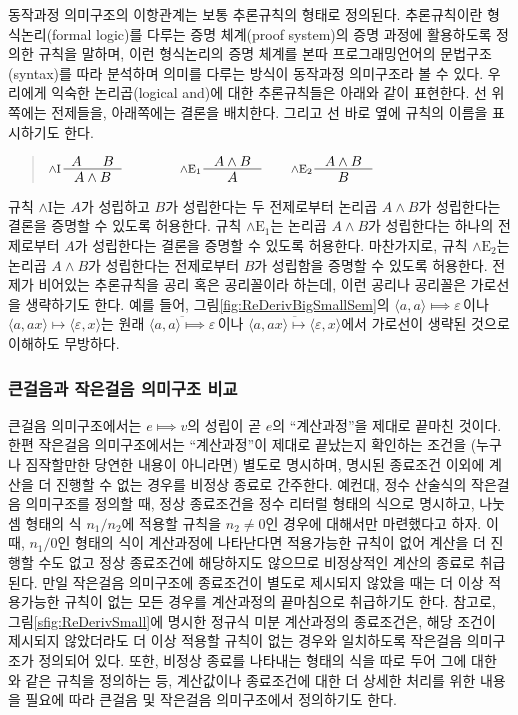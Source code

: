동작과정 의미구조의 이항관계는 보통 추론규칙의 형태로 정의된다.
추론규칙이란 형식논리(formal logic)를 다루는 증명 체계(proof system)의
증명 과정에 활용하도록 정의한 규칙을 말하며, 이런 형식논리의 증명 체계를
본따 프로그래밍언어의 문법구조(syntax)를 따라 분석하며 의미를 다루는 방식이
동작과정 의미구조라 볼 수 있다. 우리에게 익숙한 논리곱(logical and)에 대한
추론규칙들은 아래와 같이 표현한다. 선 위쪽에는 전제들을, 아래쪽에는
결론을 배치한다. 그리고 선 바로 옆에 규칙의 이름을 표시하기도 한다.
\begin{quote}
\( \inference*[$\land\mathrm{I}$]{A & B}{A \land B}\qquad\qquad
   \inference[$\land\mathrm{E}_1$]{A\land B}{A} \qquad
   \inference[$\land\mathrm{E}_2$]{A\land B}{B} \)
\end{quote}
규칙 $\land\mathrm{I}$는 $A$가 성립하고 $B$가 성립한다는 두 전제로부터
논리곱 $A\land B$가 성립한다는 결론을 증명할 수 있도록 허용한다.
규칙 $\land\mathrm{E}_1$는 논리곱 $A\land B$가 성립한다는 하나의 전제로부터
$A$가 성립한다는 결론을 증명할 수 있도록 허용한다. 마찬가지로,
규칙 $\land\mathrm{E}_2$는 논리곱 $A\land B$가 성립한다는 전제로부터
$B$가 성립함을 증명할 수 있도록 허용한다. 전제가 비어있는 추론규칙을
공리 혹은 공리꼴이라 하는데, 이런 공리나 공리꼴은 가로선을 생략하기도 한다.
예를 들어, 그림\;\ref{fig:ReDerivBigSmallSem}의
$\langle a, a\rangle\!\Longmapsto\!\varepsilon\,$이나
$\langle a, ax\rangle\!\longmapsto\!\langle\varepsilon, x\rangle$는
원래
$\overline{
  \langle a, a\rangle\!\Longmapsto\!\varepsilon}\,$이나
$\overline{
  \langle a, ax\rangle\!\longmapsto\!\langle\varepsilon, x\rangle}$에서
가로선이 생략된 것으로 이해하도 무방하다.

\subsubsection{큰걸음과 작은걸음 의미구조 비교}
큰걸음 의미구조에서는 $e\Longmapsto v$의 성립이 곧 $e$의 ``계산과정''을
제대로 끝마친 것이다. 한편 작은걸음 의미구조에서는 ``계산과정''이 제대로
끝났는지 확인하는 조건을 (누구나 짐작할만한 당연한 내용이 아니라면) 별도로
명시하며, 명시된 종료조건 이외에 계산을 더 진행할 수 없는 경우를 비정상
종료로 간주한다. 예컨대, 정수 산술식의 작은걸음 의미구조를 정의할 때,
정상 종료조건을 정수 리터럴 형태의 식으로 명시하고, 나눗셈 형태의 식
$n_1 / n_2$에 적용할 규칙을 $n_2\neq 0$인 경우에 대해서만 마련했다고 하자.
이 때, $n_1/0$인 형태의 식이 계산과정에 나타난다면 적용가능한 규칙이 없어
계산을 더 진행할 수도 없고 정상 종료조건에 해당하지도 않으므로 비정상적인
계산의 종료로 취급된다. 만일 작은걸음 의미구조에 종료조건이 별도로 제시되지
않았을 때는 더 이상 적용가능한 규칙이 없는 모든 경우를 계산과정의
끝마침으로 취급하기도 한다. 참고로, 그림\;\ref{sfig:ReDerivSmall}에 명시한
정규식 미분 계산과정의 종료조건은, 해당 조건이 제시되지 않았더라도 더 이상
적용할 규칙이 없는 경우와 일치하도록 작은걸음 의미구조가 정의되어 있다.
또한, 비정상 종료를 나타내는 형태의 식을 따로 두어 그에 대한 와 같은
규칙을 정의하는 등, 계산값이나 종료조건에 대한 더 상세한 처리를 위한
내용을 필요에 따라 큰걸음 및 작은걸음 의미구조에서 정의하기도 한다.

